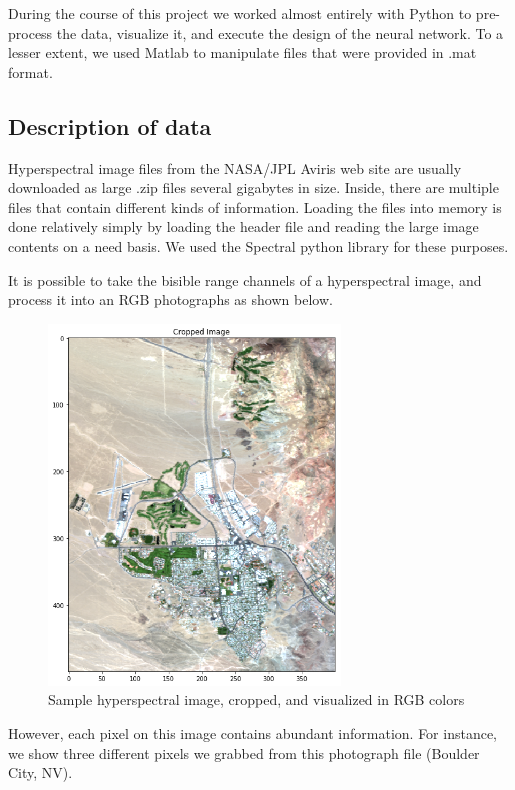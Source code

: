 \documentclass[letterpaper, 10 pt, conference]{ieeeconf}  %
\begin{document}
During the course of this project we worked almost entirely with Python to pre-process the data, visualize it, and execute the design of the neural network. To a lesser extent, we used Matlab to manipulate files that were provided in .mat format.

\subsection{Description of data}

Hyperspectral image files from the NASA/JPL Aviris web site are usually downloaded as large .zip files several gigabytes in size. Inside, there are multiple files that contain different kinds of information. Loading the files into memory is done relatively simply by loading the header file and reading the large image contents on a need basis. We used the Spectral python library for these purposes.

It is possible to take the bisible range channels of a hyperspectral image, and process it into an RGB photographs as shown below.

\begin{figure}[thpb]
      \centering
      \includegraphics[width=220pt]{BoulderCity.png}
      \caption{Sample hyperspectral image, cropped, and visualized in RGB colors}
      \label{figure_BC}
   \end{figure}


However, each pixel on this image contains abundant information. For instance, we show three different pixels we grabbed from this photograph file (Boulder City, NV).
\end{document}
